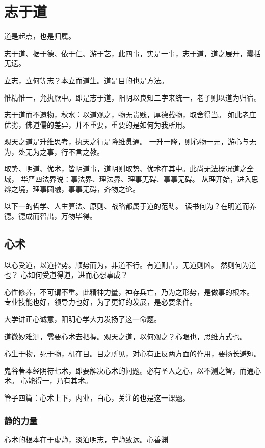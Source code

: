 \chapter{志于道}

道是起点，也是归属。

志于道、据于德、依于仁、游于艺，此四事，实是一事，志于道，道之展开，囊括无遗。

立志，立何等志？本立而道生。道是目的也是方法。

惟精惟一，允执厥中。即是志于道，阳明以良知二字来统一，老子则以道为归宿。

志于道而不遗物，秋水：以道观之，物无贵贱，厚德载物，取舍得当。
如此老庄优劣，佛道儒的差异，并不重要，重要的是如何为我所用。

观天之道是升维思考，执天之行是降维贯通。
一升一降，则心物一元，游心与无为，处无为之事，行不言之教。

取势、明道、优术，皆明道事，道明则取势、优术在其中。此尚无法概况道之全域，
华严四法界说：事法界、理法界、理事无碍、事事无碍。
从理开始，进入思辨之境，理事圆融，事事无碍，齐物之论。

以下一的哲学、人生算法、原则、战略都属于道的范畴。
读书何为？在明道而养德。德成而智出，万物毕得。

\section{心术}

以心受道，以道控势。顺势而为，非道不行。有道则吉，无道则凶。
然则何为道也？ 心如何受道得道，进而心想事成？

心性修养，不可谓不重。此精神力量，神存兵亡，乃为之形势，是做事的根本。
专业技能也好，领导力也好，为了更好的发展，是必要条件。

大学讲正心诚意，阳明心学大力发扬了这一命题。

道微妙难测，需要心术去把握。观天之道，以何观之？心眼也，思维方式也。

心生于物，死于物，机在目。目之所见，对心有正反两方面的作用，要扬长避短。

鬼谷著本经阴符七术，即要解决心术的问题。必有圣人之心，以不测之智，而通心术。
心能得一，乃有其术。

管子四篇：心术上下，内业，白心，关注的也是这一课题。

\subsection{静的力量}

心术的根本在于虚静，淡泊明志，宁静致远。心善渊

